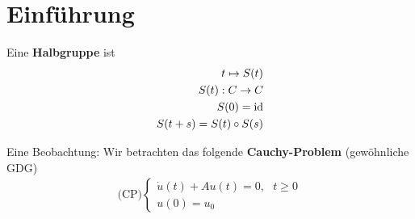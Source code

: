 
\setcounter{chapter}{-1}

\chapter{Einführung}
Eine \textbf{Halbgruppe} ist
\begin{align*}
t\mapsto S(t)\\
S(t):C\to C\\
S(0)=\operatorname{id}\\
S(t+s)=S(t)\circ S(s)
\end{align*}

Eine Beobachtung: Wir betrachten das folgende \textbf{Cauchy-Problem} (gewöhnliche GDG)
\begin{align}\label{CauchyProblem0}\tag{CP}
(\text{CP)}\left\lbrace\begin{array}{cl}
	\dot{u}(t)+Au(t)=0,~~~t\geq0\\
	u(0) =u_0
\end{array}\right.
\end{align}

